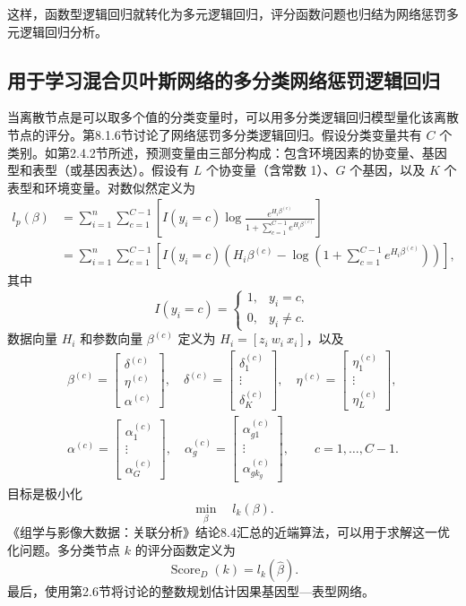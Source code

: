 这样，函数型逻辑回归就转化为多元逻辑回归，评分函数问题也归结为网络惩罚多元逻辑回归分析。

\subsection{用于学习混合贝叶斯网络的多分类网络惩罚逻辑回归}

当离散节点是可以取多个值的分类变量时，可以用多分类逻辑回归模型量化该离散节点的评分。第8.1.6节讨论了网络惩罚多分类逻辑回归。假设分类变量共有 $C$ 个类别。如第2.4.2节所述，预测变量由三部分构成：包含环境因素的协变量、基因型和表型（或基因表达）。假设有 $L$ 个协变量（含常数 1）、$G$ 个基因，以及 $K$ 个表型和环境变量。对数似然定义为
\begin{equation}
\begin{aligned}
l_p(\beta)
&=\sum_{i=1}^{n}\sum_{c=1}^{C-1}
\left[I(y_i=c)\log
\frac{e^{H_i\beta^{(c)}}}{1+\sum_{c=1}^{C-1}e^{H_i\beta^{(c)}}}\right]\\
&=\sum_{i=1}^{n}\sum_{c=1}^{C-1}
\left[I(y_i=c)\left(H_i\beta^{(c)}
-\log\left(1+\sum_{c=1}^{C-1}e^{H_i\beta^{(c)}}\right)\right)\right],
\end{aligned}\tag{2.72}
\end{equation}
其中
\[
I(y_i=c)=\begin{cases}1,&y_i=c,\\0,&y_i\ne c.\end{cases}
\]
数据向量 $H_i$ 和参数向量 $\beta^{(c)}$ 定义为 $H_i=[z_i\ w_i\ x_i]$，以及
\begin{equation}
\begin{gathered}
\beta^{(c)}=\begin{bmatrix}\delta^{(c)}\\\eta^{(c)}\\\alpha^{(c)}\end{bmatrix},
\quad
\delta^{(c)}=\begin{bmatrix}\delta_1^{(c)}\\\vdots\\\delta_K^{(c)}\end{bmatrix},
\quad
\eta^{(c)}=\begin{bmatrix}\eta_1^{(c)}\\\vdots\\\eta_L^{(c)}\end{bmatrix},\\
\alpha^{(c)}=\begin{bmatrix}\alpha_1^{(c)}\\\vdots\\\alpha_G^{(c)}\end{bmatrix},
\quad
\alpha_g^{(c)}=\begin{bmatrix}\alpha_{g1}^{(c)}\\\vdots\\\alpha_{gk_g}^{(c)}\end{bmatrix},
\qquad c=1,\ldots,C-1.
\end{gathered}\tag{2.73}
\end{equation}
目标是极小化
\begin{equation}
\min_\beta\quad l_k(\beta).
\tag{2.74}
\end{equation}
《组学与影像大数据：关联分析》结论8.4汇总的近端算法，可以用于求解这一优化问题。多分类节点 $k$ 的评分函数定义为
\begin{equation}
\operatorname{Score}_D(k)=l_k(\widehat\beta).
\tag{2.75}
\end{equation}
最后，使用第2.6节将讨论的整数规划估计因果基因型—表型网络。
\FloatBarrier
